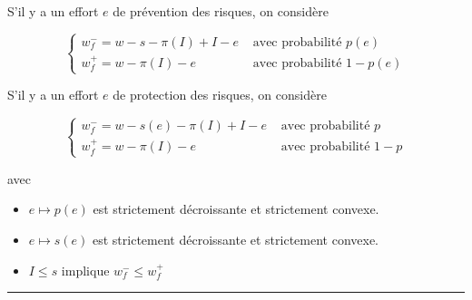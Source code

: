 \begin{f}
S'il y a un effort \(e\) de prévention des risques, on considère

\[
\begin{cases}w_{f}^{-}=w-s-\pi(I)+I-e & \text { avec probabilité } p(e) \\ w_{f}^{+}=w-\pi(I)-e & \text { avec probabilité } 1-p(e)\end{cases}
\]

S'il y a un effort \(e\) de protection des risques, on considère

\[
\begin{cases}w_{f}^{-}=w-s(e)-\pi(I)+I-e & \text { avec probabilité } p \\ w_{f}^{+}=w-\pi(I)-e & \text { avec probabilité } 1-p\end{cases}
\]

avec
\begin{itemize}
	\item \(e \mapsto p(e)\) est strictement décroissante et strictement convexe.
	\item \(e \mapsto s(e)\) est strictement décroissante et strictement convexe.\\
	\item \(I \leq s\) implique \(w_{f}^{-} \leq w_{f}^{+}\)
\end{itemize}

\end{f}
\hrule


